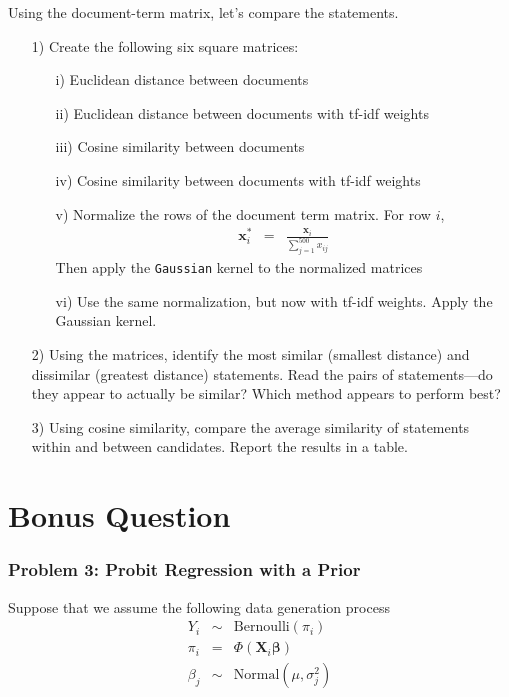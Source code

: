 \documentclass[12pt,letterpaper]{article}
\begin{document}
Using the document-term matrix, let's compare the statements.
\begin{itemize}
\item[1)] Create the following six square matrices:
\begin{itemize}
\item[i)] Euclidean distance between documents
\item[ii)] Euclidean distance between documents with tf-idf weights
\item[iii)] Cosine similarity between documents
\item[iv)] Cosine similarity between documents with tf-idf weights
\item[v)] Normalize the rows of the document term matrix.  For row $i$, 
\begin{eqnarray}
\boldsymbol{x}_{i}^{*} & = & \frac{\boldsymbol{x}_{i}}{\sum_{j=1}^{500} x_{ij}} \nonumber 
\end{eqnarray}
Then apply the {\tt Gaussian} kernel to the normalized matrices
\item[vi)] Use the same normalization, but now with tf-idf weights.  Apply the Gaussian kernel.   
\end{itemize}
\item[2)] Using the matrices, identify the most similar (smallest distance) and dissimilar (greatest distance) statements.  Read the pairs of statements---do they appear to actually be similar?  Which method appears to perform best?
\item[3)] Using cosine similarity, compare the average similarity of statements within and between candidates.  Report the results in a table.  
\end{itemize}









\section*{Bonus Question}


\subsubsection*{Problem 3: Probit Regression with a Prior}

Suppose that we assume the following data generation process
\begin{eqnarray}
Y_{i} & \sim & \text{Bernoulli}(\pi_{i} ) \nonumber \\
\pi_{i} & = & \Phi(\boldsymbol{X}_{i} \boldsymbol{\beta}) \nonumber \\
\beta_{j} & \sim & \text{Normal}(\mu, \sigma^{2}_{j} )\nonumber 
\end{eqnarray}
\end{document}
